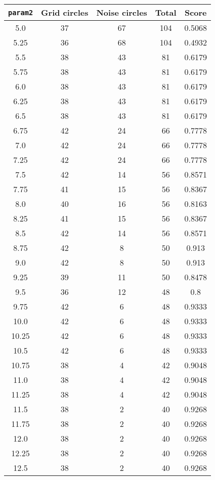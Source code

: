 \documentclass[letterpaper, 12pt]{article}
\begin{document}
\begin{longtable}{|c|c|c|c|c|}
\hline
\textbf{\texttt{param2}} & \textbf{Grid circles} & \textbf{Noise circles} & \textbf{Total} & \textbf{Score} \\
\hline
5.0 & 37 & 67 & 104 & 0.5068 \\
\hline
5.25 & 36 & 68 & 104 & 0.4932 \\
\hline
5.5 & 38 & 43 & 81 & 0.6179 \\
\hline
5.75 & 38 & 43 & 81 & 0.6179 \\
\hline
6.0 & 38 & 43 & 81 & 0.6179 \\
\hline
6.25 & 38 & 43 & 81 & 0.6179 \\
\hline
6.5 & 38 & 43 & 81 & 0.6179 \\
\hline
6.75 & 42 & 24 & 66 & 0.7778 \\
\hline
7.0 & 42 & 24 & 66 & 0.7778 \\
\hline
7.25 & 42 & 24 & 66 & 0.7778 \\
\hline
7.5 & 42 & 14 & 56 & 0.8571 \\
\hline
7.75 & 41 & 15 & 56 & 0.8367 \\
\hline
8.0 & 40 & 16 & 56 & 0.8163 \\
\hline
8.25 & 41 & 15 & 56 & 0.8367 \\
\hline
8.5 & 42 & 14 & 56 & 0.8571 \\
\hline
8.75 & 42 & 8 & 50 & 0.913 \\
\hline
9.0 & 42 & 8 & 50 & 0.913 \\
\hline
9.25 & 39 & 11 & 50 & 0.8478 \\
\hline
9.5 & 36 & 12 & 48 & 0.8 \\
\hline
9.75 & 42 & 6 & 48 & 0.9333 \\
\hline
10.0 & 42 & 6 & 48 & 0.9333 \\
\hline
10.25 & 42 & 6 & 48 & 0.9333 \\
\hline
10.5 & 42 & 6 & 48 & 0.9333 \\
\hline
10.75 & 38 & 4 & 42 & 0.9048 \\
\hline
11.0 & 38 & 4 & 42 & 0.9048 \\
\hline
11.25 & 38 & 4 & 42 & 0.9048 \\
\hline
11.5 & 38 & 2 & 40 & 0.9268 \\
\hline
11.75 & 38 & 2 & 40 & 0.9268 \\
\hline
12.0 & 38 & 2 & 40 & 0.9268 \\
\hline
12.25 & 38 & 2 & 40 & 0.9268 \\
\hline
12.5 & 38 & 2 & 40 & 0.9268 \\

\end{longtable}
\end{document}
